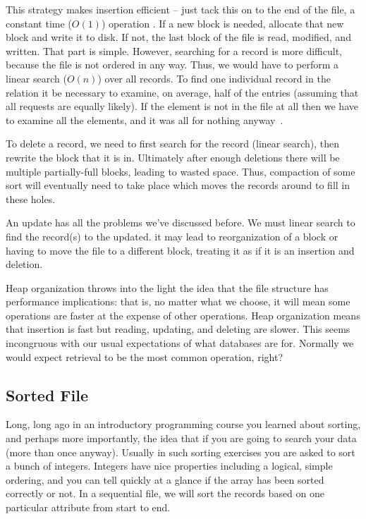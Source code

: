 This strategy makes insertion efficient -- just tack this on to the end of the file, a constant time ($O(1)$) operation . If a new block is needed, allocate that new block and write it to disk. If not, the last block of the file is read, modified, and written. That part is simple. However, searching for a record is more difficult, because the file is not ordered in any way. Thus, we would have to perform a linear search ($O(n)$) over all records. To find one individual record in the relation it be necessary to examine, on average, half of the entries (assuming that all requests are equally likely). If the element is not in the file at all then we have to examine all the elements, and it was all for nothing anyway~\cite{fds}. 

To delete a record, we need to first search for the record (linear search), then rewrite the block that it is in. Ultimately after enough deletions there will be multiple partially-full blocks, leading to wasted space. Thus, compaction of some sort will eventually need to take place which moves the records around to fill in these holes.

An update has all the problems we've discussed before. We must linear search to find the record(s) to the updated.  it may lead to reorganization of a block or having to move the file to a different block, treating it as if it is an insertion and deletion.  

Heap organization throws into the light the idea that the file structure has performance implications: that is, no matter what we choose, it will mean some operations are faster at the expense of other operations. Heap organization means that insertion is fast but reading, updating, and deleting are slower. This seems incongruous with our usual expectations of what databases are for. Normally we would expect retrieval to be the most common operation, right?

\subsection*{Sorted File}

Long, long ago in an introductory programming course you learned about sorting, and perhaps more importantly, the idea that if you are going to search your data (more than once anyway). Usually in such sorting exercises you are asked to sort a bunch of integers. Integers have nice properties including a logical, simple ordering, and you can tell quickly at a glance if the array has been sorted correctly or not. In a sequential file, we will sort the records based on one particular attribute from start to end.

